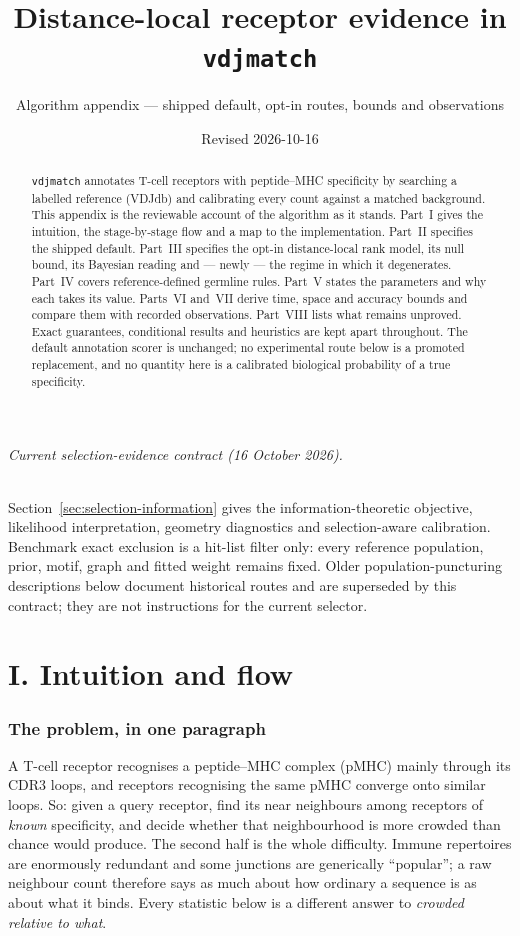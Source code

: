 \documentclass[10pt,a4paper]{article}
\title{\vspace{-12mm}Distance-local receptor evidence in \texttt{vdjmatch}}
\author{Algorithm appendix --- shipped default, opt-in routes, bounds and observations}
\date{Revised 2026-10-16}
\theoremstyle{definition}
\begin{document}
\maketitle
\vspace{-6mm}

\begin{abstract}\noindent\small
\texttt{vdjmatch} annotates T-cell receptors with peptide--MHC specificity by searching a labelled
reference (VDJdb) and calibrating every count against a matched background. This appendix is the
reviewable account of the algorithm as it stands. Part~I gives the intuition, the stage-by-stage
flow and a map to the implementation. Part~II specifies the shipped default. Part~III specifies the
opt-in distance-local rank model, its null bound, its Bayesian reading and --- newly ---
the regime in which it degenerates. Part~IV covers reference-defined germline rules.
Part~V states the parameters and why each takes its value. Parts~VI and~VII derive time, space and
accuracy bounds and compare them with recorded observations. Part~VIII lists what remains unproved.
Exact guarantees, conditional results and heuristics are kept apart throughout. The default annotation scorer is unchanged; no experimental route below is a promoted replacement, and no quantity
here is a calibrated biological probability of a true specificity.
\end{abstract}

\paragraph{Current selection-evidence contract (16 October 2026).}
Section~\ref{sec:selection-information} gives the information-theoretic objective, likelihood interpretation, geometry diagnostics and selection-aware calibration.
Benchmark exact exclusion is a hit-list filter only: every reference population, prior, motif, graph and fitted weight remains fixed.
Older population-puncturing descriptions below document historical routes and are superseded by this contract; they are not instructions for the current selector.


\part*{I. Intuition and flow}

\section{The problem, in one paragraph}
A T-cell receptor recognises a peptide--MHC complex (pMHC) mainly through its CDR3 loops, and
receptors recognising the same pMHC converge onto similar loops. So: given a query receptor, find
its near neighbours among receptors of \emph{known} specificity, and decide whether that
neighbourhood is more crowded than chance would produce. The second half is the whole difficulty.
Immune repertoires are enormously redundant and some junctions are generically ``popular'';
a raw neighbour count therefore says as much about how ordinary a sequence is as about what it
binds. Every statistic below is a different answer to \emph{crowded relative to what}.
\end{document}
